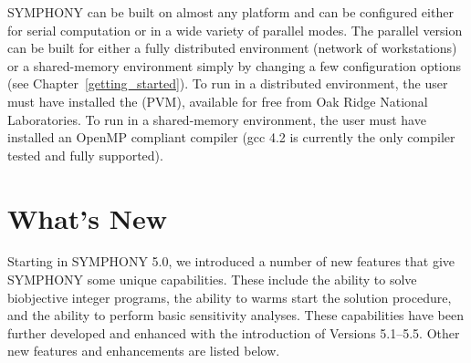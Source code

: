 SYMPHONY can be built on almost any platform and can be configured either for
serial computation or in a wide variety of parallel modes. The parallel
version can be built for either a fully distributed environment (network of
workstations) or a shared-memory environment simply by changing a few
configuration options (see Chapter~\ref{getting_started}). To run in a
distributed environment, the user must have installed the {\em
{}}
(PVM), available for free from Oak Ridge National Laboratories. To run in a
shared-memory environment, the user must have installed an OpenMP compliant
compiler (gcc 4.2 is currently the only compiler tested and fully supported).

\section{What's New}

Starting in SYMPHONY 5.0, we introduced a number of new features that give
SYMPHONY some unique capabilities. These include the ability to solve
biobjective integer programs, the ability to warms start the solution
procedure, and the ability to perform basic sensitivity analyses. These
capabilities have been further developed and enhanced with the introduction of
Versions 5.1--5.5. Other new features and enhancements are listed below.

